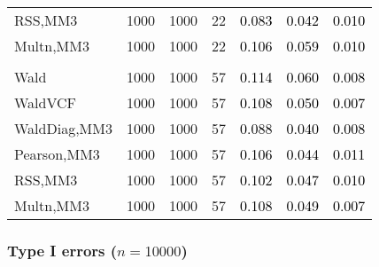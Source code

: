 \documentclass[
]{article}
\begin{document}
\begin{table}[H]
{\begin{tabular}[t]{lrrrrrr}
\hspace{1em}RSS,MM3 & 1000 & 1000 & 22 & \textcolor{black}{0.083} & \textcolor{black}{0.042} & \textcolor{black}{0.010}\\
\hspace{1em}Multn,MM3 & 1000 & 1000 & 22 & \textcolor{black}{0.106} & \textcolor{black}{0.059} & \textcolor{black}{0.010}\\
\addlinespace[0.3em]
\multicolumn{7}{l}{\textbf{3F 15V}}\\
\hspace{1em}Wald & 1000 & 1000 & 57 & \textcolor{black}{0.114} & \textcolor{black}{0.060} & \textcolor{black}{0.008}\\
\hspace{1em}WaldVCF & 1000 & 1000 & 57 & \textcolor{black}{0.108} & \textcolor{black}{0.050} & \textcolor{black}{0.007}\\
\hspace{1em}WaldDiag,MM3 & 1000 & 1000 & 57 & \textcolor{black}{0.088} & \textcolor{black}{0.040} & \textcolor{black}{0.008}\\
\hspace{1em}Pearson,MM3 & 1000 & 1000 & 57 & \textcolor{black}{0.106} & \textcolor{black}{0.044} & \textcolor{black}{0.011}\\
\hspace{1em}RSS,MM3 & 1000 & 1000 & 57 & \textcolor{black}{0.102} & \textcolor{black}{0.047} & \textcolor{black}{0.010}\\
\hspace{1em}Multn,MM3 & 1000 & 1000 & 57 & \textcolor{black}{0.108} & \textcolor{black}{0.049} & \textcolor{black}{0.007}\\
\bottomrule
\end{tabular}}
\endgroup{}
\end{table}

\subsubsection{\texorpdfstring{Type I errors
(\(n=10000\))}{Type I errors (n=10000)}}\label{type-i-errors-n10000-3}
\end{document}
